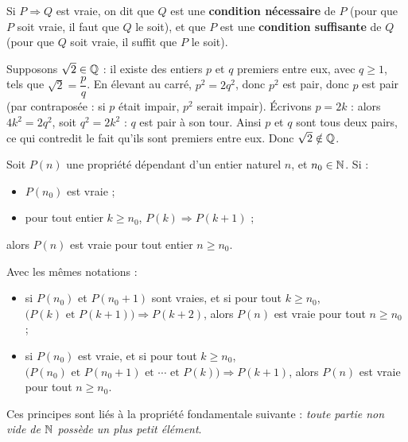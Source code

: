 \begin{definition}
Si $P\Rightarrow Q$ est vraie, on dit que $Q$ est une \textbf{condition
nécessaire} de $P$ (pour que $P$ soit vraie, il faut que $Q$ le soit), et que
$P$ est une \textbf{condition suffisante} de $Q$ (pour que $Q$ soit vraie, il
suffit que $P$ le soit).
\end{definition}

\begin{demonstration}
Supposons $\sqrt{2}\in\mathbb{Q}$ : il existe des entiers $p$ et $q$ premiers entre
eux, avec $q\geq1$, tels que $\sqrt{2}=\dfrac{p}{q}$. En élevant au carré,
$p^{2}=2q^{2}$, donc $p^{2}$ est pair, donc $p$ est pair (par contraposée :
si $p$ était impair, $p^{2}$ serait impair). Écrivons $p=2k$ : alors
$4k^{2}=2q^{2}$, soit $q^{2}=2k^{2}$ : $q$ est pair à son tour. Ainsi $p$ et
$q$ sont tous deux pairs, ce qui contredit le fait qu'ils sont premiers entre
eux. Donc $\sqrt{2}\notin\mathbb{Q}$.
\end{demonstration}


\begin{theoreme}
Soit $P(n)$ une propriété dépendant d'un entier naturel $n$, et $n_0\in\mathbb{N}$. Si :
\begin{itemize}[label={\color{otNavy}\textbullet},leftmargin=1.4em,itemsep=0.6mm,topsep=0.8mm]
  \item {} $P(n_0)$ est vraie ;
  \item {} pour tout entier $k\geq n_0$, $P(k)\Rightarrow P(k+1)$ ;
\end{itemize}
alors $P(n)$ est vraie pour tout entier $n\geq n_0$.
\end{theoreme}

\begin{theoreme}
Avec les mêmes notations :
\begin{itemize}[label={\color{otNavy}\textbullet},leftmargin=1.4em,itemsep=0.6mm,topsep=0.8mm]
  \item {} si $P(n_0)$ et $P(n_0+1)$ sont vraies, et si pour tout
    $k\geq n_0$, $\bigl(P(k)\text{ et }P(k+1)\bigr)\Rightarrow P(k+2)$, alors
    $P(n)$ est vraie pour tout $n\geq n_0$ ;
  \item {} si $P(n_0)$ est vraie, et si pour tout $k\geq n_0$,
    $\bigl(P(n_0)\text{ et }P(n_0+1)\text{ et }\cdots\text{ et }P(k)\bigr)\Rightarrow P(k+1)$,
    alors $P(n)$ est vraie pour tout $n\geq n_0$.
\end{itemize}
Ces principes sont liés à la propriété fondamentale suivante : \emph{toute
partie non vide de $\mathbb{N}$ possède un plus petit élément}.
\end{theoreme}

